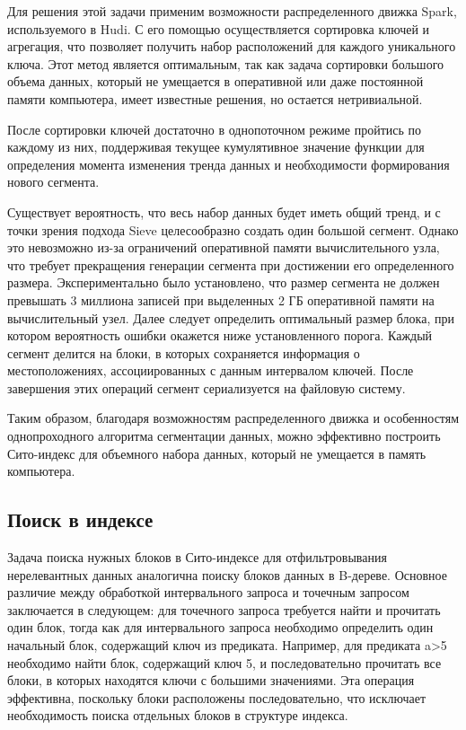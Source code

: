 Для решения этой задачи применим возможности распределенного движка Spark, используемого в Hudi. С его помощью осуществляется сортировка ключей и агрегация, что позволяет получить набор расположений для каждого уникального ключа. Этот метод является оптимальным, так как задача сортировки большого объема данных, который не умещается в оперативной или даже постоянной памяти компьютера, имеет известные решения, но остается нетривиальной.

После сортировки ключей достаточно в однопоточном режиме пройтись по каждому из них, поддерживая текущее кумулятивное значение функции для определения момента изменения тренда данных и необходимости формирования нового сегмента.

Существует вероятность, что весь набор данных будет иметь общий тренд, и с точки зрения подхода Sieve целесообразно создать один большой сегмент. Однако это невозможно из-за ограничений оперативной памяти вычислительного узла, что требует прекращения генерации сегмента при достижении его определенного размера. Экспериментально было установлено, что размер сегмента не должен превышать 3 миллиона записей при выделенных 2 ГБ оперативной памяти на вычислительный узел. Далее следует определить оптимальный размер блока, при котором вероятность ошибки окажется ниже установленного порога. Каждый сегмент делится на блоки, в которых сохраняется информация о местоположениях, ассоциированных с данным интервалом ключей. После завершения этих операций сегмент сериализуется на файловую систему.

Таким образом, благодаря возможностям распределенного движка и особенностям однопроходного алгоритма сегментации данных, можно эффективно построить Сито-индекс для объемного набора данных, который не умещается в память компьютера.

\subsection{Поиск в индексе}

Задача поиска нужных блоков в Сито-индексе для отфильтровывания нерелевантных данных аналогична поиску блоков данных в B-дереве. Основное различие между обработкой интервального запроса и точечным запросом заключается в следующем: для точечного запроса требуется найти и прочитать один блок, тогда как для интервального запроса необходимо определить один начальный блок, содержащий ключ из предиката. Например, для предиката a>5 необходимо найти блок, содержащий ключ 5, и последовательно прочитать все блоки, в которых находятся ключи с большими значениями. Эта операция эффективна, поскольку блоки расположены последовательно, что исключает необходимость поиска отдельных блоков в структуре индекса.

